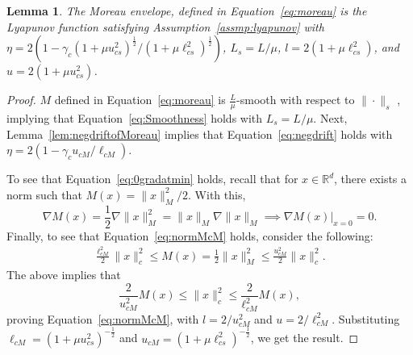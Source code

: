 \documentclass{article}
\newcommand{\R}{\mathbb{R}}
\newcommand{\lcm}{\ell_{cM}}
\newcommand{\ucm}{u_{cM}}
\newcommand{\lcs}{\ell_{cs}}
\newcommand{\ucs}{u_{cs}}
\newtheorem{lemma}[theorem]{Lemma}
\begin{document}
\begin{lemma}\label{lem:assmpLyapunov_cont}
    The Moreau envelope, defined in Equation~\eqref{eq:moreau} is the Lyapunov function satisfying Assumption~\ref{assmp:lyapunov} with $\eta = 2(1- \gamma_c (1 + \mu \ucs^2)^{\frac{1}{2}} /(1 + \mu \lcs^2)^{\frac{1}{2}})$, $L_s= L/\mu$, $l = 2 (1 + \mu \lcs^2)$, and $u = 2 (1 + \mu \ucs^2)$.  
\end{lemma}
\begin{proof}
    $M$ defined in Equation~\eqref{eq:moreau} is $\frac{L}{\mu}$-smooth with respect to $\|\cdot\|_s$ \cite[Lemma 2.1]{chen2020finite}, implying that Equation~\eqref{eq:Smoothness} holds with $L_s = L/\mu$. 
    Next, Lemma~\ref{lem:negdriftofMoreau} implies that Equation~\eqref{eq:negdrift} holds with $\eta = 2(1- \gamma_c \ucm / \lcm)$.  
    
    To see that Equation~\eqref{eq:0gradatmin} holds, recall that for $x\in\R^d$, there exists a norm such that $M(x) = \|x\|^2_M/2$. With this, 
    \[\nabla M(x) = \frac{1}{2}\nabla \|x\|^2_M = \|x\|_M \nabla \|x\|_M \implies \nabla M(x) \rvert_{x=0}  = 0.\] 
    Finally, to see that Equation~\eqref{eq:normMcM} holds, consider the following: 
    \begin{align*}
        \frac{\lcm^2}{2} \|x\|^2_c \le M(x) = \frac{1}{2} \|x\|^2_M \le \frac{\ucm^2}{2} \|x\|^2_c. 
    \end{align*}
    The above implies that 
    \[ \frac{2}{\ucm^2} M(x) \le \|x\|^2_c \le \frac{2}{\lcm^2} M(x),\]
    proving Equation~\eqref{eq:normMcM}, with $l = 2/\ucm^2$ and $u = 2/\lcm^2$. Substituting $\lcm = (1 + \mu \ucs^2)^{-\frac{1}{2}}$ and $\ucm = (1 + \mu \lcs^2)^{-\frac{1}{2}}$, we get the result.
\end{proof}
\end{document}
